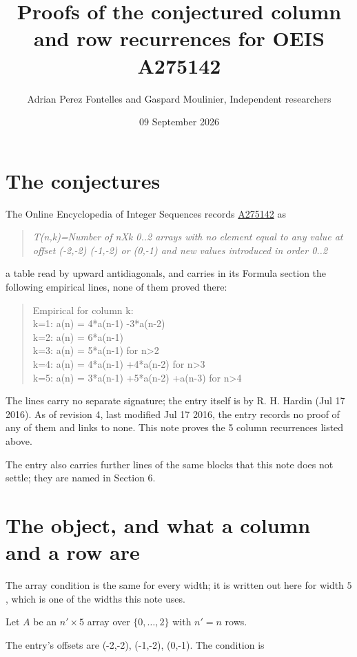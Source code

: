 \documentclass[11pt]{article}
\title{Proofs of the conjectured column and row recurrences for OEIS A275142}
\author{Adrian Perez Fontelles and Gaspard Moulinier, Independent researchers}
\date{09 September 2026}
\theoremstyle{definition}
\begin{document}
\maketitle
\section{The conjectures}

The Online Encyclopedia of Integer Sequences records \href{https://oeis.org/A275142}{A275142} as

\begin{quote}\itshape T(n,k)=Number of nXk 0..2 arrays with no element equal to any value at offset (-2,-2) (-1,-2) or (0,-1) and new values introduced in order 0..2\end{quote}

a table read by upward antidiagonals, and carries in its Formula section the following empirical lines, none of them proved there:

\begin{quote}\ttfamily Empirical for column k:\\
k=1: a(n) = 4*a(n-1) -3*a(n-2)\\k=2: a(n) = 6*a(n-1)\\k=3: a(n) = 5*a(n-1) for n>2\\k=4: a(n) = 4*a(n-1) +4*a(n-2) for n>3\\k=5: a(n) = 3*a(n-1) +5*a(n-2) +a(n-3) for n>4\end{quote}

The lines carry no separate signature; the entry itself is by R. H. Hardin (Jul 17 2016). As of revision 4, last modified Jul 17 2016, the entry records no proof of any of them and links to none. This note proves the 5 column recurrences listed above.

The entry also carries further lines of the same blocks that this note does not settle; they are named in Section 6.

\section{The object, and what a column and a row are}

The array condition is the same for every width; it is written out here for width $5$, which is one of the widths this note uses.

Let $A$ be an $n' \times 5$ array over $\{0,\dots,2\}$ with $n' = n$ rows.

The entry's offsets are (-2,-2), (-1,-2), (0,-1). The condition is
\end{document}
